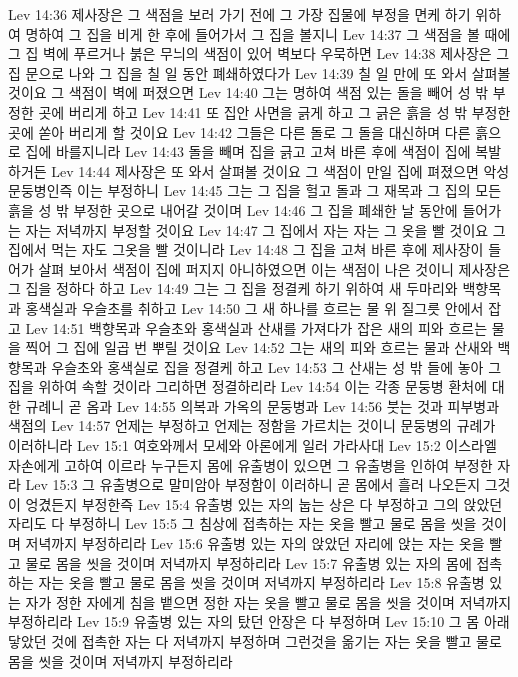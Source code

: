 Lev 14:36  제사장은 그 색점을 보러 가기 전에 그 가장 집물에 부정을 면케 하기 위하여 명하여 그 집을 비게 한 후에 들어가서 그 집을 볼지니
Lev 14:37  그 색점을 볼 때에 그 집 벽에 푸르거나 붉은 무늬의 색점이 있어 벽보다 우묵하면
Lev 14:38  제사장은 그 집 문으로 나와 그 집을 칠 일 동안 폐쇄하였다가
Lev 14:39  칠 일 만에 또 와서 살펴볼 것이요 그 색점이 벽에 퍼졌으면
Lev 14:40  그는 명하여 색점 있는 돌을 빼어 성 밖 부정한 곳에 버리게 하고
Lev 14:41  또 집안 사면을 긁게 하고 그 긁은 흙을 성 밖 부정한 곳에 쏟아 버리게 할 것이요
Lev 14:42  그들은 다른 돌로 그 돌을 대신하며 다른 흙으로 집에 바를지니라
Lev 14:43  돌을 빼며 집을 긁고 고쳐 바른 후에 색점이 집에 복발하거든
Lev 14:44  제사장은 또 와서 살펴볼 것이요 그 색점이 만일 집에 펴졌으면 악성 문둥병인즉 이는 부정하니
Lev 14:45  그는 그 집을 헐고 돌과 그 재목과 그 집의 모든 흙을 성 밖 부정한 곳으로 내어갈 것이며
Lev 14:46  그 집을 폐쇄한 날 동안에 들어가는 자는 저녁까지 부정할 것이요
Lev 14:47  그 집에서 자는 자는 그 옷을 빨 것이요 그 집에서 먹는 자도 그옷을 빨 것이니라
Lev 14:48  그 집을 고쳐 바른 후에 제사장이 들어가 살펴 보아서 색점이 집에 퍼지지 아니하였으면 이는 색점이 나은 것이니 제사장은 그 집을 정하다 하고
Lev 14:49  그는 그 집을 정결케 하기 위하여 새 두마리와 백향목과 홍색실과 우슬초를 취하고
Lev 14:50  그 새 하나를 흐르는 물 위 질그릇 안에서 잡고
Lev 14:51  백향목과 우슬초와 홍색실과 산새를 가져다가 잡은 새의 피와 흐르는 물을 찍어 그 집에 일곱 번 뿌릴 것이요
Lev 14:52  그는 새의 피와 흐르는 물과 산새와 백향목과 우슬초와 홍색실로 집을 정결케 하고
Lev 14:53  그 산새는 성 밖 들에 놓아 그 집을 위하여 속할 것이라 그리하면 정결하리라
Lev 14:54  이는 각종 문둥병 환처에 대한 규례니 곧 옴과
Lev 14:55  의복과 가옥의 문둥병과
Lev 14:56  붓는 것과 피부병과 색점의
Lev 14:57  언제는 부정하고 언제는 정함을 가르치는 것이니 문둥병의 규례가 이러하니라
Lev 15:1  여호와께서 모세와 아론에게 일러 가라사대
Lev 15:2  이스라엘 자손에게 고하여 이르라 누구든지 몸에 유출병이 있으면 그 유출병을 인하여 부정한 자라
Lev 15:3  그 유출병으로 말미암아 부정함이 이러하니 곧 몸에서 흘러 나오든지 그것이 엉겼든지 부정한즉
Lev 15:4  유출병 있는 자의 눕는 상은 다 부정하고 그의 앉았던 자리도 다 부정하니
Lev 15:5  그 침상에 접촉하는 자는 옷을 빨고 물로 몸을 씻을 것이며 저녁까지 부정하리라
Lev 15:6  유출병 있는 자의 앉았던 자리에 앉는 자는 옷을 빨고 물로 몸을 씻을 것이며 저녁까지 부정하리라
Lev 15:7  유출병 있는 자의 몸에 접촉하는 자는 옷을 빨고 물로 몸을 씻을 것이며 저녁까지 부정하리라
Lev 15:8  유출병 있는 자가 정한 자에게 침을 뱉으면 정한 자는 옷을 빨고 물로 몸을 씻을 것이며 저녁까지 부정하리라
Lev 15:9  유출병 있는 자의 탔던 안장은 다 부정하며
Lev 15:10  그 몸 아래 닿았던 것에 접촉한 자는 다 저녁까지 부정하며 그런것을 옮기는 자는 옷을 빨고 물로 몸을 씻을 것이며 저녁까지 부정하리라
